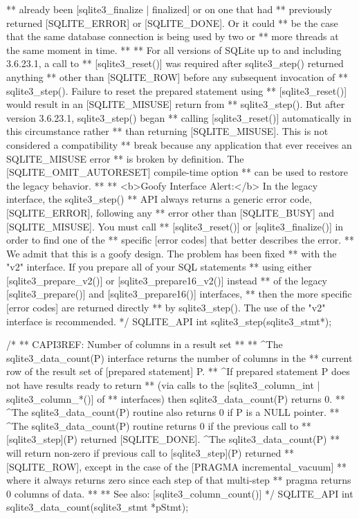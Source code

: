 \begin{Codex}[label=sqlite3.h,numbers=left]
{** already been [sqlite3_finalize | finalized] or on one that had
** previously returned [SQLITE_ERROR] or [SQLITE_DONE].  Or it could
** be the case that the same database connection is being used by two or
** more threads at the same moment in time.
**
** For all versions of SQLite up to and including 3.6.23.1, a call to
** [sqlite3_reset()] was required after sqlite3_step() returned anything
** other than [SQLITE_ROW] before any subsequent invocation of
** sqlite3_step().  Failure to reset the prepared statement using 
** [sqlite3_reset()] would result in an [SQLITE_MISUSE] return from
** sqlite3_step().  But after version 3.6.23.1, sqlite3_step() began
** calling [sqlite3_reset()] automatically in this circumstance rather
** than returning [SQLITE_MISUSE].  This is not considered a compatibility
** break because any application that ever receives an SQLITE_MISUSE error
** is broken by definition.  The [SQLITE_OMIT_AUTORESET] compile-time option
** can be used to restore the legacy behavior.
**
** <b>Goofy Interface Alert:</b> In the legacy interface, the sqlite3_step()
** API always returns a generic error code, [SQLITE_ERROR], following any
** error other than [SQLITE_BUSY] and [SQLITE_MISUSE].  You must call
** [sqlite3_reset()] or [sqlite3_finalize()] in order to find one of the
** specific [error codes] that better describes the error.
** We admit that this is a goofy design.  The problem has been fixed
** with the "v2" interface.  If you prepare all of your SQL statements
** using either [sqlite3_prepare_v2()] or [sqlite3_prepare16_v2()] instead
** of the legacy [sqlite3_prepare()] and [sqlite3_prepare16()] interfaces,
** then the more specific [error codes] are returned directly
** by sqlite3_step().  The use of the "v2" interface is recommended.
*/
SQLITE_API int sqlite3_step(sqlite3_stmt*);

/*
** CAPI3REF: Number of columns in a result set
**
** ^The sqlite3_data_count(P) interface returns the number of columns in the
** current row of the result set of [prepared statement] P.
** ^If prepared statement P does not have results ready to return
** (via calls to the [sqlite3_column_int | sqlite3_column_*()] of
** interfaces) then sqlite3_data_count(P) returns 0.
** ^The sqlite3_data_count(P) routine also returns 0 if P is a NULL pointer.
** ^The sqlite3_data_count(P) routine returns 0 if the previous call to
** [sqlite3_step](P) returned [SQLITE_DONE].  ^The sqlite3_data_count(P)
** will return non-zero if previous call to [sqlite3_step](P) returned
** [SQLITE_ROW], except in the case of the [PRAGMA incremental_vacuum]
** where it always returns zero since each step of that multi-step
** pragma returns 0 columns of data.
**
** See also: [sqlite3_column_count()]
*/
SQLITE_API int sqlite3_data_count(sqlite3_stmt *pStmt);

}
\end{Codex}
